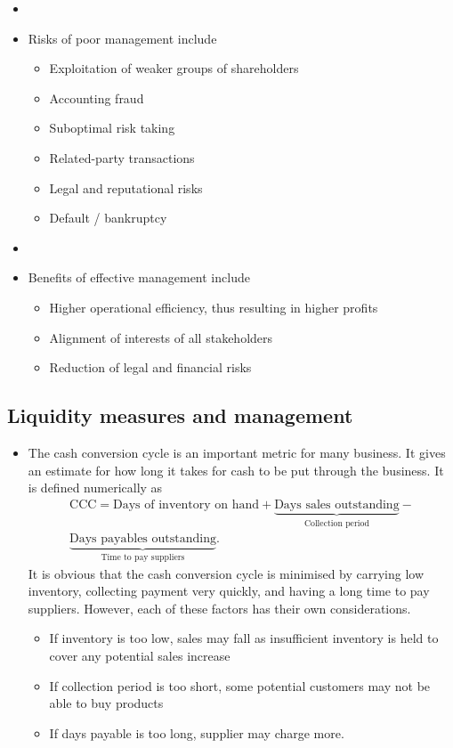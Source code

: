 \documentclass[../notes_compiled.tex]{subfiles}
\begin{document}
\begin{itemize}
\item[]
\item Risks of poor management include
\begin{itemize}
\item Exploitation of weaker groups of shareholders
\item Accounting fraud
\item Suboptimal risk taking
\item Related-party transactions
\item Legal and reputational risks
\item Default / bankruptcy
\end{itemize}

\item[]
\item Benefits of effective management include
\begin{itemize}
\item Higher operational efficiency, thus resulting in higher profits
\item Alignment of interests of all stakeholders
\item Reduction of legal and financial risks
\end{itemize}
\end{itemize}

\subsection{Liquidity measures and management}
\begin{itemize}
\item The cash conversion cycle is an important metric for many business. It gives an estimate for how long it takes for cash to be put through the business. It is defined numerically as
\begin{multline}
\text{CCC} = \text{Days of inventory on hand} + \underbrace{\text{Days sales outstanding}}_{\text{Collection period}} - \\ \underbrace{\text{Days payables outstanding}}_{\text{Time to pay suppliers}}. \label{ccc}
\end{multline}
It is obvious that the cash conversion cycle is minimised by carrying low inventory, collecting payment very quickly, and having a long time to pay suppliers. However, each of these factors has their own considerations.
\begin{itemize}
\item If inventory is too low, sales may fall as insufficient inventory is held to cover any potential sales increase
\item If collection period is too short, some potential customers may not be able to buy products
\item If days payable is too long, supplier may charge more.
\end{itemize}
\end{itemize}
\end{document}
